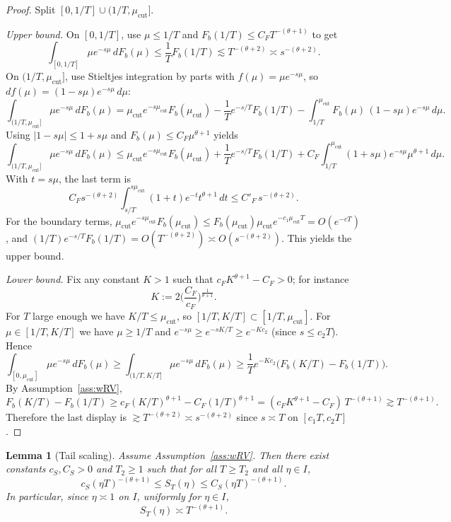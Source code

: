 \documentclass[11pt]{article}
\newtheorem{lemma}{Lemma}
\begin{document}
\begin{proof}
Split $[0,1/T]\cup(1/T,\mu_{\mathrm{cut}}]$.

\emph{Upper bound.}
On $[0,1/T]$, use $\mu\le 1/T$ and $F_b(1/T)\le C_FT^{-(\theta+1)}$ to get
\[
\int_{[0,1/T]} \mu e^{-s\mu}\,dF_b(\mu) \le \frac{1}{T}F_b(1/T) \lesssim T^{-(\theta+2)}
\asymp s^{-(\theta+2)}.
\]
On $(1/T,\mu_{\mathrm{cut}}]$, use Stieltjes integration by parts with
$f(\mu)=\mu e^{-s\mu}$, so $df(\mu)=(1-s\mu)e^{-s\mu}\,d\mu$:
\[
\int_{(1/T,\mu_{\mathrm{cut}}]} \mu e^{-s\mu}\,dF_b(\mu)
=
\mu_{\mathrm{cut}}e^{-s\mu_{\mathrm{cut}}}F_b(\mu_{\mathrm{cut}})
-\frac{1}{T}e^{-s/T}F_b(1/T)
-\int_{1/T}^{\mu_{\mathrm{cut}}} F_b(\mu)\,(1-s\mu)e^{-s\mu}\,d\mu.
\]
Using $|1-s\mu|\le 1+s\mu$ and $F_b(\mu)\le C_F\mu^{\theta+1}$ yields
\[
\int_{(1/T,\mu_{\mathrm{cut}}]} \mu e^{-s\mu}\,dF_b(\mu)
\le
\mu_{\mathrm{cut}}e^{-s\mu_{\mathrm{cut}}}F_b(\mu_{\mathrm{cut}})
+\frac{1}{T}e^{-s/T}F_b(1/T)
+C_F\int_{1/T}^{\mu_{\mathrm{cut}}} (1+s\mu)e^{-s\mu}\mu^{\theta+1}\,d\mu.
\]
With $t=s\mu$, the last term is
\[
C_F s^{-(\theta+2)}\int_{s/T}^{s\mu_{\mathrm{cut}}} (1+t)e^{-t}t^{\theta+1}\,dt
\le C'_F\,s^{-(\theta+2)}.
\]
For the boundary terms, $ \mu_{\mathrm{cut}}e^{-s\mu_{\mathrm{cut}}}F_b(\mu_{\mathrm{cut}})
\le F_b(\mu_{\mathrm{cut}})\mu_{\mathrm{cut}}e^{-c_1\mu_{\mathrm{cut}}T}=O(e^{-cT})$,
and $(1/T)e^{-s/T}F_b(1/T)=O(T^{-(\theta+2)})\asymp O(s^{-(\theta+2)})$.
This yields the upper bound.

\medskip
\emph{Lower bound.}
Fix any constant $K>1$ such that $c_F K^{\theta+1}-C_F>0$; for instance
\[
K:=2\Big(\frac{C_F}{c_F}\Big)^{\frac{1}{\theta+1}}.
\]
For $T$ large enough we have $K/T\le\mu_{\mathrm{cut}}$, so
$[1/T,K/T]\subset[1/T,\mu_{\mathrm{cut}}]$.
For $\mu\in[1/T,K/T]$ we have $\mu\ge 1/T$ and
$e^{-s\mu}\ge e^{-sK/T}\ge e^{-Kc_2}$ (since $s\le c_2T$). Hence
\[
\int_{[0,\mu_{\mathrm{cut}}]} \mu e^{-s\mu}\,dF_b(\mu)
\ge \int_{(1/T,K/T]} \mu e^{-s\mu}\,dF_b(\mu)
\ge \frac{1}{T}e^{-Kc_2}\big(F_b(K/T)-F_b(1/T)\big).
\]
By Assumption~\ref{ass:wRV},
\[
F_b(K/T)-F_b(1/T)\ge c_F(K/T)^{\theta+1}-C_F(1/T)^{\theta+1}
=(c_FK^{\theta+1}-C_F)\,T^{-(\theta+1)}\gtrsim T^{-(\theta+1)}.
\]
Therefore the last display is $\gtrsim T^{-(\theta+2)}\asymp s^{-(\theta+2)}$ since
$s\asymp T$ on $[c_1T,c_2T]$.
\end{proof}

\begin{lemma}[Tail scaling]\label{lem:ST}
Assume Assumption~\ref{ass:wRV}. Then there exist constants $c_S,C_S>0$ and $T_2\ge 1$
such that for all $T\ge T_2$ and all $\eta\in I$,
\[
c_S(\eta T)^{-(\theta+1)}\le S_T(\eta)\le C_S(\eta T)^{-(\theta+1)}.
\]
In particular, since $\eta\asymp 1$ on $I$, uniformly for $\eta\in I$,
\[
S_T(\eta)\asymp T^{-(\theta+1)}.
\]
\end{lemma}
\end{document}
